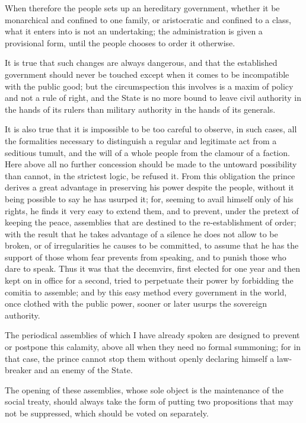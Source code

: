 \documentclass[12pt]{report}
\begin{document}
When therefore the people sets up an hereditary government, whether it be monarchical and confined to one family, or aristocratic and confined to a class, what it enters into is not an undertaking; the administration is given a provisional form, until the people chooses to order it otherwise.

It is true that such changes are always dangerous, and that the established government should never be touched except when it comes to be incompatible with the public good; but the circumspection this involves is a maxim of policy and not a rule of right, and the State is no more bound to leave civil authority in the hands of its rulers than military authority in the hands of its generals.

It is also true that it is impossible to be too careful to observe, in such cases, all the formalities necessary to distinguish a regular and legitimate act from a seditious tumult, and the will of a whole people from the clamour of a faction. Here above all no further concession should be made to the untoward possibility than cannot, in the strictest logic, be refused it. From this obligation the prince derives a great advantage in preserving his power despite the people, without it being possible to say he has usurped it; for, seeming to avail himself only of his rights, he finds it very easy to extend them, and to prevent, under the pretext of keeping the peace, assemblies that are destined to the re-establishment of order; with the result that he takes advantage of a silence he does not allow to be broken, or of irregularities he causes to be committed, to assume that he has the support of those whom fear prevents from speaking, and to punish those who dare to speak. Thus it was that the decemvirs, first elected for one year and then kept on in office for a second, tried to perpetuate their power by forbidding the comitia to assemble; and by this easy method every government in the world, once clothed with the public power, sooner or later usurps the sovereign authority.

The periodical assemblies of which I have already spoken are designed to prevent or postpone this calamity, above all when they need no formal summoning; for in that case, the prince cannot stop them without openly declaring himself a law-breaker and an enemy of the State.

The opening of these assemblies, whose sole object is the maintenance of the social treaty, should always take the form of putting two propositions that may not be suppressed, which should be voted on separately.
\end{document}
